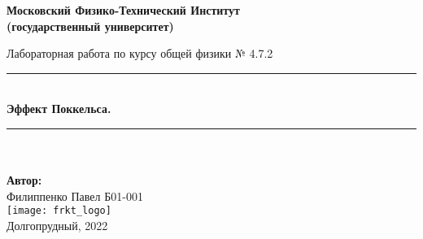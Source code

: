 \newcommand{\HRule}{\rule{\linewidth}{0.7mm}} %
	
	\begin{center}
		\large\textbf{Московский Физико-Технический Институт}\\ %
		\large\textbf{(государственный университет)}
	
		\vfill
		
		\Large Лабораторная работа по курсу общей физики № 4.7.2\\[0.5cm] %
		
		
		\HRule
		\\[0.4cm]
		{ \huge \bfseries Эффект Поккельса.}%
		\\[0.4cm] 
		\HRule
		\\[0.5cm]
		
		\ \\
	\textbf{\large Автор:} \\	
	\large Филиппенко Павел Б01-001\\ %
		\vfill
		\hspace*{-0.8 cm}\texttt{[image: frkt\_logo]}\\ %
		\large Долгопрудный, 2022 %
	\end{center}

\newpage
\setcounter{page}{2}
\fancyfoot[c]{\thepage}
\fancyhead[R]{}